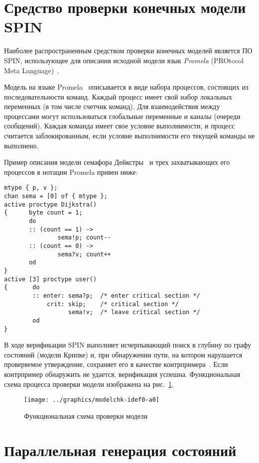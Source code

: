\documentclass[12pt,a4paper,fleqn]{article}
\begin{document}
\section{Средство проверки конечных модели SPIN}
\label{sec:spin}

Наиболее распространенным средством проверки конечных моделей является ПО SPIN, использующее для описания исходной
модели язык \emph{Promela} (PROtocol Meta Language)~\cite{SpinRoot}.

Модель на языке Promela~ описывается в виде набора процессов, состоящих из последовательности команд. Каждый процесс
имеет свой набор локальных переменных (в том числе счетчик команд). Для взаимодействия между процессами могут
использоваться глобальные переменные и каналы (очереди сообщений). Каждая команда имеет свое условие выполнимости, и
процесс считается заблокированным, если условие выполнимости его текущей команды не выполнено.

Пример описания модели семафора Дейкстры~\cite{SPIN} и трех захватывающих его процессов в нотации Promela привен ниже:

\begin{lstlisting}[language=Promela]
mtype { p, v };
chan sema = [0] of { mtype };
active proctype Dijkstra()
{      byte count = 1;
       do
       :: (count == 1) ->
               sema!p; count--
       :: (count == 0) ->
               sema?v; count++
       od
}
active [3] proctype user()
{       do
        :: enter: sema?p;  /* enter critical section */
            crit: skip;    /* critical section */
                  sema!v;  /* leave critical section */
        od
}
\end{lstlisting}

В ходе верификации SPIN выполняет исчерпывающий поиск в глубину по графу состояний (модели Крипке) и, при обнаружении
пути, на котором нарушается проверяемое утверждение, сохраняет его в качестве контрпримера~\cite{Clarke}. Если
контрпример обнаружить не удается, верификация успешна. Функциональная схема процесса проверки модели изображена на
рис.~\ref{fig:modelchk-idef0-a0}.

\begin{figure}[ht]
  \centering
  \texttt{[image: ../graphics/modelchk-idef0-a0]}
  \caption{Функциональная схема проверки модели}
  \label{fig:modelchk-idef0-a0}
\end{figure}

\section{Параллельная генерация состояний}
\label{sec:pargen}
\end{document}
